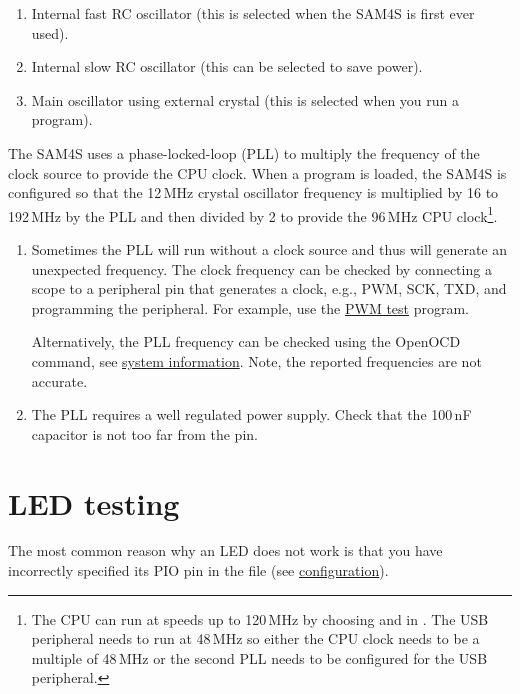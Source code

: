 \begin{enumerate}
\item
  Internal fast RC oscillator (this is selected when the SAM4S is first
  ever used).
\item
  Internal slow RC oscillator (this can be selected to save power).
\item
  Main oscillator using external crystal (this is selected when you
  run a program).
\end{enumerate}

The SAM4S uses a phase-locked-loop (PLL) to multiply the frequency of
the clock source to provide the CPU clock.  When a program is loaded,
the SAM4S is configured so that the 12\,MHz crystal oscillator
frequency is multiplied by 16 to 192\,MHz by the PLL and then divided
by 2 to provide the 96\,MHz CPU clock\footnote{The CPU can run at
  speeds up to 120\,MHz by choosing  and
   in .  The USB peripheral needs to
  run at 48\,MHz so either the CPU clock needs to be a multiple of
  48\,MHz or the second PLL needs to be configured for the USB
  peripheral.}.

\begin{enumerate}
\item Sometimes the PLL will run without a clock source and thus will
  generate an unexpected frequency.  The clock frequency can be
  checked by connecting a scope to a peripheral pin that generates a
  clock, e.g., PWM, SCK, TXD, and programming the peripheral.  For
  example, use the \hyperref[pwm-test]{PWM test} program.

  Alternatively, the PLL frequency can be checked using the OpenOCD
   command, see
  \hyperref[system-information]{system information}.  Note, the
  reported frequencies are not accurate.

\item The PLL requires a well regulated power supply.  Check that the
  100\,nF capacitor is not too far from the  pin.
\end{enumerate}


\section{LED testing}
\label{debugging-LED}

The most common reason why an LED does not work is that you have
incorrectly specified its PIO pin in the  file (see
\protect\hyperref[configuration]{configuration}).

